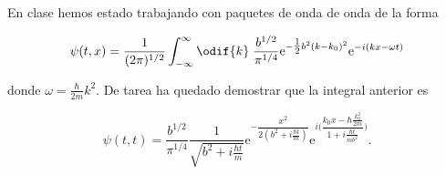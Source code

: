 \documentclass[../main.tex]{subfiles}
\begin{document}
\begin{problema}
	En clase hemos estado trabajando con paquetes de onda de onda
	de la forma

	\begin{equation*}
		\psi(t, x) = \dfrac{1}{(2\pi)^{1/2}}\int_{-\infty}^{\infty}\odif{k}\; \dfrac{b^{1/2}}{\pi^{1/4}}\mathrm{e}^{-\tfrac{1}{2}b^{2}(k - k_{0})^{2}}\mathrm{e}^{-i(kx - \omega t)}
	\end{equation*}

	donde \(\omega = \tfrac{\hbar}{2m}k^{2}\). De tarea ha quedado demostrar
	que la integral anterior es

	\begin{equation}
		\psi(t, t) = \dfrac{b^{1/2}}{\pi^{1/4}}\dfrac{1}{\sqrt{b^{2} + i\tfrac{\hbar t}{m}}}
		\mathrm{e}^{-\dfrac{x^{2}}{2(b^{2} + i\tfrac{\hbar t}{m})}}\mathrm{e}^{i \Biggl(\dfrac{k_{0}x - \hbar\tfrac{k_{0}^{2}}{2m}}{1 + i \tfrac{\hbar t}{mb^{2}}}\Biggr)}.
	\end{equation}
\end{problema}
\end{document}
